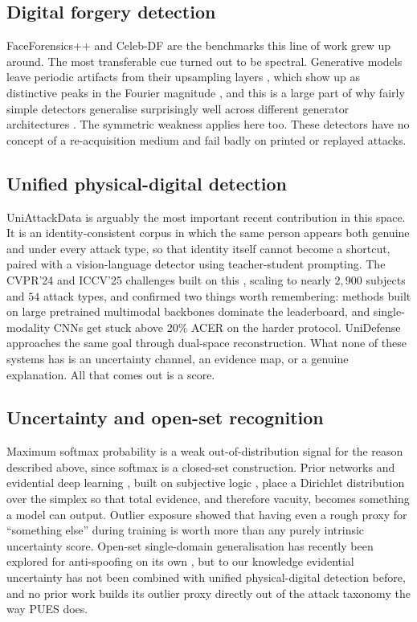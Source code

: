 \documentclass[conference]{IEEEtran}
\begin{document}
\subsection{Digital forgery detection}
FaceForensics++ \cite{rossler2019ff} and Celeb-DF \cite{li2020celebdf} are the
benchmarks this line of work grew up around. The most transferable cue turned out
to be spectral. Generative models leave periodic artifacts from their upsampling
layers \cite{odena2016checkerboard}, which show up as distinctive peaks in the
Fourier magnitude \cite{frank2020frequency}, and this is a large part of why fairly
simple detectors generalise surprisingly well across different generator
architectures \cite{wang2020cnnspot}. The symmetric weakness applies here too. These
detectors have no concept of a re-acquisition medium and fail badly on printed or
replayed attacks.

\subsection{Unified physical-digital detection}
UniAttackData \cite{yu2024unified} is arguably the most important recent
contribution in this space. It is an identity-consistent corpus in which the same
person appears both genuine and under every attack type, so that identity itself
cannot become a shortcut, paired with a vision-language detector using
teacher-student prompting. The CVPR'24 and ICCV'25 challenges built on this
\cite{yuan2024challenge,ma2025uniattackplus}, scaling to nearly $2{,}900$ subjects
and $54$ attack types, and confirmed two things worth remembering: methods built on
large pretrained multimodal backbones dominate the leaderboard, and
single-modality CNNs get stuck above $20\%$ ACER on the harder protocol. UniDefense
\cite{zhang2024unidefense} approaches the same goal through dual-space
reconstruction. What none of these systems has is an uncertainty channel, an
evidence map, or a genuine explanation. All that comes out is a score.

\subsection{Uncertainty and open-set recognition}
Maximum softmax probability \cite{hendrycks2017msp} is a weak out-of-distribution
signal for the reason described above, since softmax is a closed-set
construction. Prior networks \cite{malinin2018prior} and evidential deep learning
\cite{sensoy2018edl}, built on subjective logic \cite{josang2016subjective}, place a
Dirichlet distribution over the simplex so that total evidence, and therefore
vacuity, becomes something a model can output. Outlier exposure
\cite{hendrycks2019oe} showed that having even a rough proxy for ``something else''
during training is worth more than any purely intrinsic uncertainty score. Open-set
single-domain generalisation has recently been explored for anti-spoofing on its own
\cite{liu2024openset}, but to our knowledge evidential uncertainty has not been
combined with unified physical-digital detection before, and no prior work builds
its outlier proxy directly out of the attack taxonomy the way PUES does.
\end{document}
